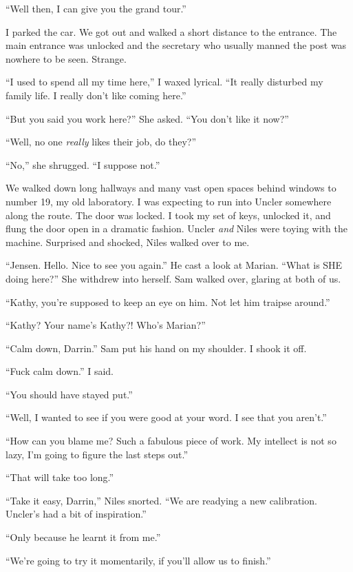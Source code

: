 ``Well then, I can give you the grand tour.''

I parked the car. We got out and walked a short distance to the
entrance. The main entrance was unlocked and the secretary who usually
manned the post was nowhere to be seen. Strange.

``I used to spend all my time here,'' I waxed lyrical. ``It really
disturbed my family life. I really don't like coming here.''

``But you said you work here?'' She asked. ``You don't like it now?''

``Well, no one \emph{really} likes their job, do they?''

``No,'' she shrugged. ``I suppose not.''

We walked down long hallways and many vast open spaces behind windows to
number 19, my old laboratory. I was expecting to run into Uncler
somewhere along the route. The door was locked. I took my set of keys,
unlocked it, and flung the door open in a dramatic fashion. Uncler
\emph{and} Niles were toying with the machine. Surprised and shocked,
Niles walked over to me.

``Jensen. Hello. Nice to see you again.'' He cast a look at Marian.
``What is SHE doing here?'' She withdrew into herself. Sam walked over,
glaring at both of us.

``Kathy, you're supposed to keep an eye on him. Not let him traipse
around.''

``Kathy? Your name's Kathy?! Who's Marian?''

``Calm down, Darrin.'' Sam put his hand on my shoulder. I shook it off.

``Fuck calm down.'' I said.

``You should have stayed put.''

``Well, I wanted to see if you were good at your word. I see that you
aren't.''

``How can you blame me? Such a fabulous piece of work. My intellect is
not so lazy, I'm going to figure the last steps out.''

``That will take too long.''

``Take it easy, Darrin,'' Niles snorted. ``We are readying a new
calibration. Uncler's had a bit of inspiration.''

``Only because he learnt it from me.''

``We're going to try it momentarily, if you'll allow us to finish.''

